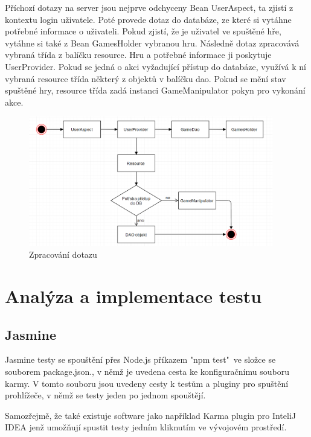 \documentclass[czech,master,public,dept460,male,cpdeclaration,twoside]{diploma}
\begin{document}
Příchozí dotazy na server jsou nejprve odchyceny Bean UserAspect, ta zjistí z kontextu login uživatele. Poté provede dotaz do databáze, ze které si vytáhne potřebné informace o uživateli. Pokud zjistí, že je uživatel ve spuštěné hře, vytáhne si také z Bean GamesHolder vybranou hru. Následně dotaz zpracovává vybraná třída z balíčku resource. Hru a potřebné informace ji poskytuje UserProvider. Pokud se jedná o akci vyžadující přístup do databáze, využívá k ní vybraná resource třída některý z objektů v balíčku dao. Pokud se mění stav spuštěné hry, resource třída zadá instanci GameManipulator pokyn pro vykonání akce.

\begin{figure}[H]
\centering\includegraphics[width=0.95\textwidth]{Figures/RequestFlow.png}\caption{Zpracování dotazu}
\end{figure}

\section{Analýza a implementace testu}

\subsection{Jasmine}
Jasmine testy se spouštění přes Node.js příkazem "npm test"~ve složce se souborem package.json., v němž je uvedena cesta ke konfiguračnímu souboru karmy. V tomto souboru jsou uvedeny cesty k testům a pluginy pro spuštění prohlížeče, v němž se testy jeden po jednom spouštějí. 

Samozřejmě, že také existuje software jako například Karma plugin pro InteliJ IDEA jenž umožňují spustit testy jedním kliknutím ve vývojovém prostředí.
\end{document}

